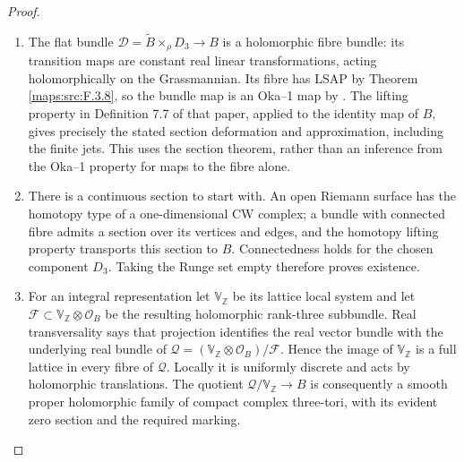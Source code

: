 \begin{proof}
\begin{enumerate}[label=\arabic*.]
\item The flat bundle
$\mathscr D=\widetilde B\times_\rho D_3\to B$ is a holomorphic
fibre bundle: its transition maps are constant real linear
transformations, acting holomorphically on the Grassmannian.
Its fibre has LSAP by Theorem \ref{maps:src:F.3.8}, so the bundle map is an
Oka--1 map by \cite[Proposition 7.13(d), p.~24]{IVVOkaOneV5}.
The lifting property in Definition 7.7 of that paper, applied
to the identity map of $B$, gives precisely the stated section
deformation and approximation, including the finite jets.
This uses the section theorem, rather than an inference from
the Oka--1 property for maps to the fibre alone.

\item There is a continuous section to start with.  An open Riemann
surface has the homotopy type of a one-dimensional CW complex;
a bundle with connected fibre admits a section over its vertices
and edges, and the homotopy lifting property transports this
section to $B$.  Connectedness holds for the chosen component
$D_3$.  Taking the Runge set empty therefore proves existence.

\item For an integral representation let $\mathbb V_\mathbb Z$ be its
lattice local system and let $\mathcal F\subset
\mathbb V_\mathbb Z\otimes\mathcal O_B$ be the resulting
holomorphic rank-three subbundle.  Real transversality says that
projection identifies the real vector bundle with the underlying
real bundle of
$\mathcal Q=(\mathbb V_\mathbb Z\otimes\mathcal O_B)/\mathcal F$.
Hence the image of $\mathbb V_\mathbb Z$ is a full lattice in
every fibre of $\mathcal Q$.  Locally it is uniformly discrete
and acts by holomorphic translations.  The quotient
$\mathcal Q/\mathbb V_\mathbb Z\to B$ is consequently a smooth
proper holomorphic family of compact complex three-tori,
with its evident zero section and the required marking.

\end{enumerate}
\end{proof}




